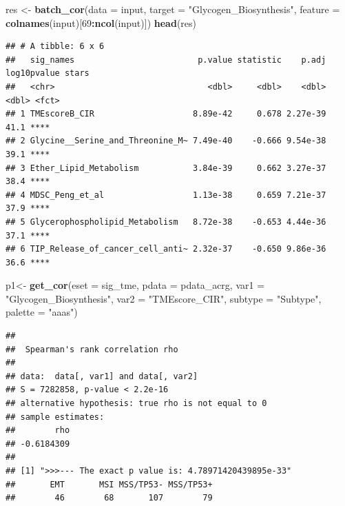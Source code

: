 \documentclass[
  12pt,
]{book}
\newenvironment{Shaded}{\begin{snugshade}}{\end{snugshade}}
\newcommand{\AttributeTok}[1]{\textcolor[rgb]{0.13,0.29,0.53}{#1}}
\newcommand{\DecValTok}[1]{\textcolor[rgb]{0.00,0.00,0.81}{#1}}
\newcommand{\FunctionTok}[1]{\textcolor[rgb]{0.13,0.29,0.53}{\textbf{#1}}}
\newcommand{\NormalTok}[1]{#1}
\newcommand{\OtherTok}[1]{\textcolor[rgb]{0.56,0.35,0.01}{#1}}
\newcommand{\SpecialCharTok}[1]{\textcolor[rgb]{0.81,0.36,0.00}{\textbf{#1}}}
\newcommand{\StringTok}[1]{\textcolor[rgb]{0.31,0.60,0.02}{#1}}
\begin{document}
\begin{Shaded}
\begin{Highlighting}[]
\NormalTok{res }\OtherTok{\textless{}{-}} \FunctionTok{batch\_cor}\NormalTok{(}\AttributeTok{data =}\NormalTok{ input, }\AttributeTok{target =} \StringTok{"Glycogen\_Biosynthesis"}\NormalTok{, }\AttributeTok{feature =} \FunctionTok{colnames}\NormalTok{(input)[}\DecValTok{69}\SpecialCharTok{:}\FunctionTok{ncol}\NormalTok{(input)])}
\FunctionTok{head}\NormalTok{(res)}
\end{Highlighting}
\end{Shaded}

\begin{verbatim}
## # A tibble: 6 x 6
##   sig_names                         p.value statistic    p.adj log10pvalue stars
##   <chr>                               <dbl>     <dbl>    <dbl>       <dbl> <fct>
## 1 TMEscoreB_CIR                    8.89e-42     0.678 2.27e-39        41.1 **** 
## 2 Glycine__Serine_and_Threonine_M~ 7.49e-40    -0.666 9.54e-38        39.1 **** 
## 3 Ether_Lipid_Metabolism           3.84e-39     0.662 3.27e-37        38.4 **** 
## 4 MDSC_Peng_et_al                  1.13e-38     0.659 7.21e-37        37.9 **** 
## 5 Glycerophospholipid_Metabolism   8.72e-38    -0.653 4.44e-36        37.1 **** 
## 6 TIP_Release_of_cancer_cell_anti~ 2.32e-37    -0.650 9.86e-36        36.6 ****
\end{verbatim}

\begin{Shaded}
\begin{Highlighting}[]
\NormalTok{p1}\OtherTok{\textless{}{-}} \FunctionTok{get\_cor}\NormalTok{(}\AttributeTok{eset =}\NormalTok{ sig\_tme, }\AttributeTok{pdata =}\NormalTok{ pdata\_acrg, }\AttributeTok{var1 =} \StringTok{"Glycogen\_Biosynthesis"}\NormalTok{, }\AttributeTok{var2 =} \StringTok{"TMEscore\_CIR"}\NormalTok{, }\AttributeTok{subtype =} \StringTok{"Subtype"}\NormalTok{, }\AttributeTok{palette =} \StringTok{"aaas"}\NormalTok{)}
\end{Highlighting}
\end{Shaded}

\begin{verbatim}
## 
##  Spearman's rank correlation rho
## 
## data:  data[, var1] and data[, var2]
## S = 7282858, p-value < 2.2e-16
## alternative hypothesis: true rho is not equal to 0
## sample estimates:
##        rho 
## -0.6184309 
## 
## [1] ">>>--- The exact p value is: 4.78971420439895e-33"
##       EMT       MSI MSS/TP53- MSS/TP53+ 
##        46        68       107        79
\end{verbatim}
\end{document}
